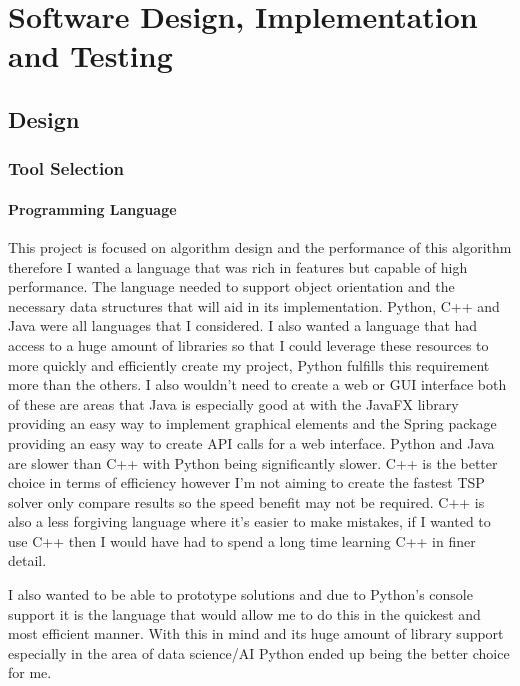 \chapter{Software Design, Implementation and Testing}

\section{Design}

\subsection{Tool Selection }

\subsubsection{Programming Language}

This project is focused on algorithm design and the performance of this algorithm therefore I wanted a language that was rich in features but capable of high performance. The language needed to support object orientation and the necessary data structures that will aid in its implementation. Python, C++ and Java were all languages that I considered. I also wanted a language that had access to a huge amount of libraries so that I could leverage these resources to more quickly and efficiently create my project, Python fulfills this requirement more than the others. I also wouldn't need to create a web or GUI interface both of these are areas that Java is especially good at with the JavaFX library providing an easy way to implement graphical elements and the Spring package providing an easy way to create API calls for a web interface. Python and Java are slower than C++\cite{java_vs_c++}\cite{c++_vs_python} with Python being significantly slower. C++ is the better choice in terms of efficiency however I'm not aiming to create the fastest TSP solver only compare results so the speed benefit may not be required. C++ is also a less forgiving language where it's easier to make mistakes, if I wanted to use C++ then I would have had to spend a long time learning C++ in finer detail. 

I also wanted to be able to prototype solutions and due to Python's console support it is the language that would allow me to do this in the quickest and most efficient manner. With this in mind and its huge amount of library support especially in the area of data science/AI Python ended up being the better choice for me. 

